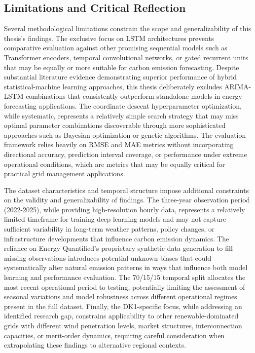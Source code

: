 \subsection{Limitations and Critical Reflection}

Several methodological limitations constrain the scope and generalizability of this thesis's findings. The exclusive focus on LSTM architectures prevents comparative evaluation against other promising sequential models such as Transformer encoders, temporal convolutional networks, or gated recurrent units that may be equally or more suitable for carbon emission forecasting. Despite substantial literature evidence demonstrating superior performance of hybrid statistical-machine learning approaches, this thesis deliberately excludes ARIMA-LSTM combinations that consistently outperform standalone models in energy forecasting applications. The coordinate descent hyperparameter optimization, while systematic, represents a relatively simple search strategy that may miss optimal parameter combinations discoverable through more sophisticated approaches such as Bayesian optimization or genetic algorithms. The evaluation framework relies heavily on RMSE and MAE metrics without incorporating directional accuracy, prediction interval coverage, or performance under extreme operational conditions, which are metrics that may be equally critical for practical grid management applications.

The dataset characteristics and temporal structure impose additional constraints on the validity and generalizability of findings. The three-year observation period (2022-2025), while providing high-resolution hourly data, represents a relatively limited timeframe for training deep learning models and may not capture sufficient variability in long-term weather patterns, policy changes, or infrastructure developments that influence carbon emission dynamics. The reliance on Energy Quantified's proprietary synthetic data generation to fill missing observations introduces potential unknown biases that could systematically alter natural emission patterns in ways that influence both model learning and performance evaluation. The 70/15/15 temporal split allocates the most recent operational period to testing, potentially limiting the assessment of seasonal variations and model robustness across different operational regimes present in the full dataset. Finally, the DK1-specific focus, while addressing an identified research gap, constrains applicability to other renewable-dominated grids with different wind penetration levels, market structures, interconnection capacities, or merit-order dynamics, requiring careful consideration when extrapolating these findings to alternative regional contexts.

